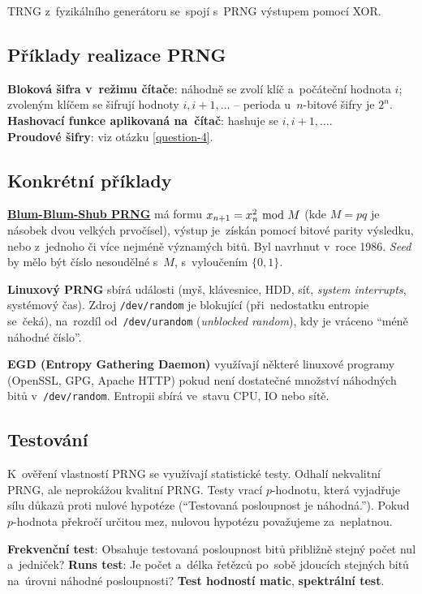 TRNG z~fyzikálního generátoru se~spojí s~PRNG výstupem pomocí XOR.

\subsection{Příklady realizace PRNG}

\textbf{Bloková šifra v~režimu čítače}: náhodně se zvolí klíč a~počáteční hodnota $i$; zvoleným klíčem se šifrují hodnoty $i, i+1, \dots$ -- perioda u~$n$-bitové šifry je $2^n$. \\
\textbf{Hashovací funkce aplikovaná na~čítač}: hashuje se $i, i+1, \dots$. \\
\textbf{Proudové šifry}: viz otázku \ref{question-4}.

\subsection{Konkrétní příklady}

\textbf{\href{https://en.wikipedia.org/wiki/Blum_Blum_Shub}{Blum-Blum-Shub PRNG}} má formu $x_{n+1} = x_n^2 \ \mathrm{mod}\ M$ (kde $M = pq$ je násobek dvou velkých prvočísel), výstup je~získán pomocí bitové parity výsledku, nebo z~jednoho či více nejméně významých bitů. Byl navrhnut v~roce 1986. \emph{Seed} by mělo být číslo nesoudělné s~$M$, s~vyloučením $\{0, 1\}$.

\textbf{Linuxový PRNG} sbírá události (myš, klávesnice, HDD, síť, \emph{system interrupts}, systémový čas). Zdroj \texttt{/dev/random} je blokující (při~nedostatku entropie se~čeká), na~rozdíl od~\texttt{/dev/urandom} (\emph{unblocked random}), kdy je vráceno \enquote{méně náhodné číslo}.

\textbf{EGD (Entropy Gathering Daemon)} využívají některé linuxové programy (OpenSSL, GPG, Apache HTTP) pokud není dostatečné množství náhodných bitů v~\texttt{/dev/random}. Entropii sbírá ve~stavu CPU, IO nebo sítě.

\subsection{Testování}

K~ověření vlastností PRNG se využívají statistické testy. Odhalí nekvalitní PRNG, ale neprokážou kvalitní PRNG. Testy vrací $p$-hodnotu, která vyjadřuje sílu důkazů proti nulové hypotéze (\enquote{Testovaná posloupnost je náhodná.}). Pokud $p$-hodnota překročí určitou mez, nulovou hypotézu považujeme za~neplatnou.

\textbf{Frekvenční test}: Obsahuje testovaná posloupnost bitů přibližně stejný počet nul a~jedniček? \textbf{Runs test}: Je počet a~délka řetězců po~sobě jdoucích stejných bitů na~úrovni náhodné posloupnosti? \textbf{Test hodností matic}, \textbf{spektrální test}.


